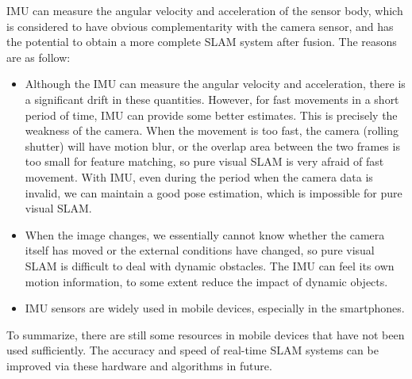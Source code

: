 \ac{IMU} can measure the angular velocity and acceleration of the sensor body, which is considered to have obvious complementarity with the camera sensor, and has the potential to obtain a more complete SLAM system after fusion. The reasons are as follow:
\begin{itemize}
    \item Although the IMU can measure the angular velocity and acceleration, there is a significant drift in these quantities. However, for fast movements in a short period of time, IMU can provide some better estimates. This is precisely the weakness of the camera. When the movement is too fast, the camera (rolling shutter) will have motion blur, or the overlap area between the two frames is too small for feature matching, so pure visual SLAM is very afraid of fast movement. With IMU, even during the period when the camera data is invalid, we can maintain a good pose estimation, which is impossible for pure visual SLAM.
    \item When the image changes, we essentially cannot know whether the camera itself has moved or the external conditions have changed, so pure visual SLAM is difficult to deal with dynamic obstacles. The IMU can feel its own motion information, to some extent reduce the impact of dynamic objects.
    \item IMU sensors are widely used in mobile devices, especially in the smartphones. 
\end{itemize}

To summarize, there are still some resources in mobile devices that have not been used sufficiently. The accuracy and speed of real-time SLAM systems can be improved via these hardware and algorithms in future.